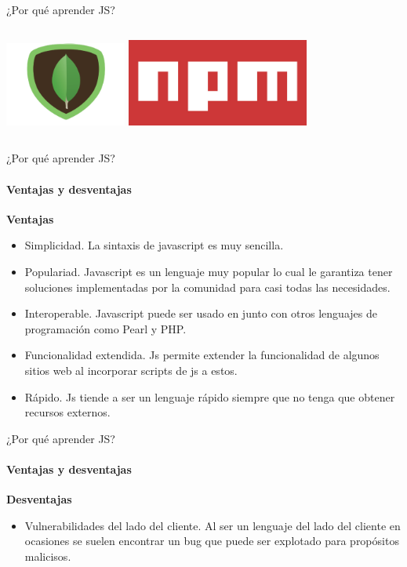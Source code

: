 \documentclass[aspectratio=169]{beamer}
\begin{document}
\begin{darkframes}
\begin{frame}{¿Por qué aprender JS?}
\begin{columns}[T]
        \begin{column}{.5\textwidth}
          \centering
        \includegraphics[width=4cm]{mongo}
        \vspace{4mm}
        \includegraphics[width=6cm]{download-1589848489734}
        \end{column}

      \end{columns}

    \end{frame}

    \begin{frame}{¿Por qué aprender JS?}
      \framesubtitle{Ventajas y desventajas}
      \textbf{Ventajas}
      \begin{itemize}
        \item Simplicidad. La sintaxis de javascript es muy sencilla.
        \item Populariad. Javascript es un lenguaje muy popular lo cual le garantiza tener soluciones implementadas por la comunidad para casi todas las necesidades.
        \item Interoperable. Javascript puede ser usado en junto con otros lenguajes de programación como Pearl y PHP.
        \item Funcionalidad extendida. Js permite extender la funcionalidad de algunos sitios web al incorporar scripts de js a estos.
        \item Rápido. Js tiende a ser un lenguaje rápido siempre que no tenga que obtener recursos externos.
      \end{itemize}
    \end{frame}

    \begin{frame}{¿Por qué aprender JS?}
      \framesubtitle{Ventajas y desventajas}
      \textbf{Desventajas}
      \begin{itemize}
        \item Vulnerabilidades del lado del cliente. Al ser un lenguaje del lado del cliente en ocasiones se suelen encontrar un bug que puede ser explotado para propósitos malicisos.


\end{itemize}
\end{frame}
\end{darkframes}
\end{document}
